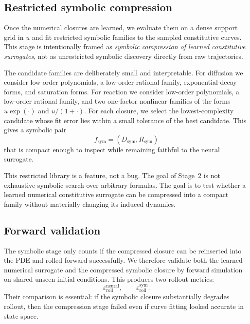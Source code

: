 \subsection{Restricted symbolic compression}

Once the numerical closures are learned, we evaluate them on a dense support grid in $u$ and fit restricted symbolic families to the sampled constitutive curves. This stage is intentionally framed as \emph{symbolic compression of learned constitutive surrogates}, not as unrestricted symbolic discovery directly from raw trajectories.

The candidate families are deliberately small and interpretable. For diffusion we consider low-order polynomials, a low-order rational family, exponential-decay forms, and saturation forms. For reaction we consider low-order polynomials, a low-order rational family, and two one-factor nonlinear families of the forms $u\exp(\cdot)$ and $u/(1+\cdot)$. For each closure, we select the lowest-complexity candidate whose fit error lies within a small tolerance of the best candidate. This gives a symbolic pair
\begin{equation}
f_{\text{sym}} = \left( D_{\text{sym}}, R_{\text{sym}} \right)
\end{equation}
that is compact enough to inspect while remaining faithful to the neural surrogate.

This restricted library is a feature, not a bug. The goal of Stage~2 is not exhaustive symbolic search over arbitrary formulas. The goal is to test whether a learned numerical constitutive surrogate can be compressed into a compact family without materially changing its induced dynamics.

\subsection{Forward validation}

The symbolic stage only counts if the compressed closure can be reinserted into the PDE and rolled forward successfully. We therefore validate both the learned numerical surrogate and the compressed symbolic closure by forward simulation on shared unseen initial conditions. This produces two rollout metrics:
\begin{equation}
\varepsilon_{\text{roll}}^{\text{neural}},
\qquad
\varepsilon_{\text{roll}}^{\text{sym}}.
\end{equation}
Their comparison is essential: if the symbolic closure substantially degrades rollout, then the compression stage failed even if curve fitting looked accurate in state space.
